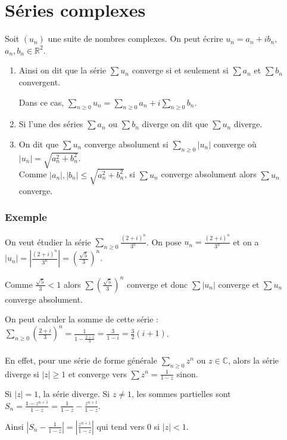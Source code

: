\documentclass[a4paper,10pt]{book} %
\newcommand{\R}{\mathbb{R}}
\newcommand{\C}{\mathbb{C}}
\newcommand{\abs}[1]{\left|#1\right|}
\begin{document}
\section{Séries complexes}
Soit $(u_n)$ une suite de nombres complexes. On peut écrire $u_n=a_n+ib_n$, $a_n,b_n\in\R^2$.

\begin{enumerate}
\item Ainsi on dit que la série $\sum u_n$ converge si et seulement si $\sum a_n$ et $\sum b_n$ convergent.

Dans ce cas, $\sum_{n\geq 0} u_n=\sum_{n\geq 0} a_n+i\sum_{n\geq 0} b_n$.\smallskip

\item Si l'une des séries $\sum a_n$ ou $\sum b_n$ diverge on dit que $\sum u_n$ diverge.\smallskip

\item On dit que $\sum u_n$ converge absolument si $\sum_{n\geq 0} \abs{u_n}$ converge où $\abs{u_n}=\sqrt{a_n^2+b_n^2}$.\\
Comme $\abs{a_n},\abs{b_n}\leq \sqrt{a_n^2+b_n^2}$, si $\sum u_n$ converge absolument alors $\sum u_n$ converge.
\end{enumerate}

\subsubsection{Exemple}
On veut étudier la série $\sum_{n\geq 0} \frac{(2+i)^n}{3^n}$. On pose $u_n=\frac{(2+i)^n}{3^n}$ et on a $\abs{u_n}=\abs{\frac{(2+i)^n}{3^n}}=(\frac{\sqrt{5}}{3})^n$.\smallskip

Comme $\frac{\sqrt{5}}{3}<1$ alors $\sum (\frac{\sqrt{5}}{3})^n$ converge et donc $\sum\abs{u_n}$ converge et $\sum u_n$ converge absolument.\smallskip

On peut calculer la somme de cette série : $\sum_{n\geq 0} (\frac{2+i}{3})^n=\frac{1}{1-\frac{2+i}{3}}=\frac{3}{1-i}=\frac{3}{2}(i+1)$.\\\\
En effet, pour une série de forme générale $\sum_{n\geq 0} z^n$ ou $z\in \C$, alors la série diverge si $\abs{z}\geq 1$ et converge vers $\sum z^n= \frac{1}{1-z}$ sinon.\smallskip

Si $\abs{z}=1$, la série diverge. Si $z\neq 1$, les sommes partielles sont $S_n=\frac{1-z^{n+1}}{1-z}=\frac{1}{1-z}-\frac{z^{n+1}}{1-z}$.\smallskip

Ainsi $\abs{S_n-\frac{1}{1-z}}= \abs{\frac{z^{n+1}}{1-z}}$ qui tend vers 0 si $\abs{z}<1$.
\end{document}
